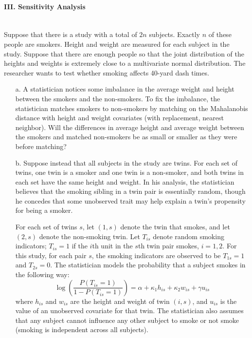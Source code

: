 \documentclass{article}
\begin{document}
\paragraph{\Large III. Sensitivity Analysis \\ \\}

  Suppose that there is a study with 
      a total of $2n$ subjects.
      Exactly $n$ of these people are smokers.
     Height and weight are measured for
      each subject in the study.
      Suppose that there are enough people so that
      the joint distribution of the heights and weights is extremely close to a
      multivariate normal distribution.
      The researcher wants to test whether smoking affects 40-yard dash times.
      \begin{itemize}
        \item[a.]
          A statistician notices some imbalance in the average weight and height 
          between the smokers and the non-smokers.         
          To fix the imbalance, the statistician matches smokers
          to non-smokers by matching 
          on the Mahalanobis distance with height and weight covariates          
          (with replacement, nearest neighbor).
          Will the differences in average height and average
          weight between the smokers
          and matched non-smokers            
          be as small or smaller as they were before matching?
        \item[b.]
          Suppose instead that all subjects in the study are twins.
          For each set of twins, one twin is a smoker and one twin is a non-smoker,
          and both twins in each set have the same height and weight.
          In his analysis, the statistician believes that 
          the smoking sibling in a twin pair 
          is essentially random, though he concedes
          that some unobserved trait may help explain a twin's 
          propensity for being a smoker.
           
          For each set of twins $s$, let $(1,s)$ denote the twin that smokes,
          and let $(2,s)$ denote the non-smoking twin.
          Let $T_{is}$ denote random smoking indicators;
          $T_{is} = 1$ if the $i$th unit in the $s$th twin pair smokes, $i = 1,2$.
          For this study, for each pair $s$, 
          the smoking indicators are observed to be $T_{1s} = 1$
          and $T_{2s} = 0$.
          The statistician models the probability that a subject smokes in the following way:
          \begin{equation}
            \log\left( 
              \frac{P(T_{is} = 1)}{1 - P(T_{is} = 1)}
            \right) = \alpha + \kappa_1 h_{is} + \kappa_2 w_{is} + \gamma u_{is}
            \label{probassign}
          \end{equation}
          where $h_{is}$ and $w_{is}$ are the height and weight of twin $(i,s)$,
          and $u_{is}$ is the value of an unobserved covariate for that twin.
          The statistician also assumes that any subject cannot influence
          any other subject to smoke or not smoke
          (smoking is independent across all subjects).
           

\end{itemize}
\end{document}
